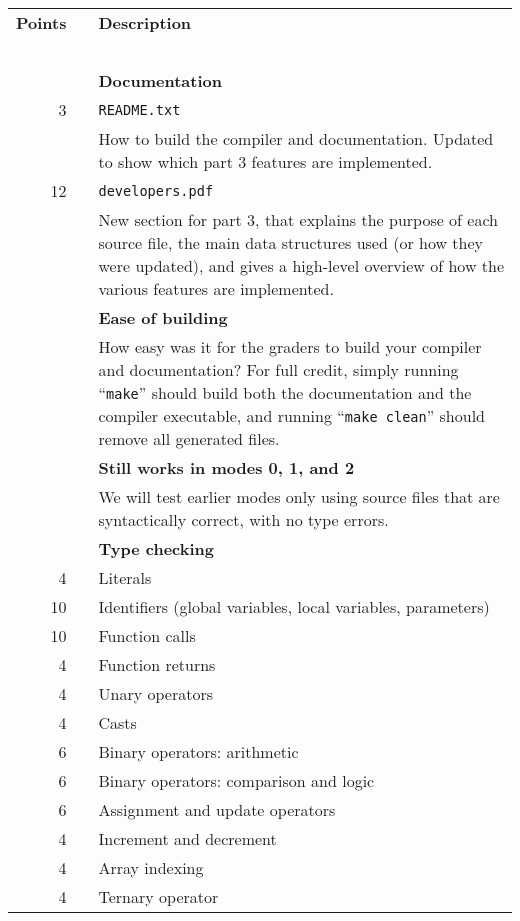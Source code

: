 \documentclass{article}
\makeatletter
\newcommand{\gradeline}{ \cline{1-2} \cline{4-4} ~\\[-1.5ex] }
\newenvironment{gradetable}{\begin{longtable}{@{}rrcp{5in}} \multicolumn{2}{l}{\bf Points} & & {\bf Description}\\ \gradeline}{\end{longtable}}
\newcommand{\mainitem}[2]{\pagebreak[2] {\bf #1} &&& {\bf #2}}
\newcommand{\mainpara}[1]{~ &&& {#1} }
\newcommand{\inneritem}[2]{~ & #1 && #2}
\newcommand{\innerpara}[1]{~ & ~ && #1}
\newcommand{\parser}{2}
\newcommand{\typecheck}{3}
\makeatother
\begin{document}
\noindent
\begin{gradetable}
  \mainitem{15}{Documentation}
  \\[1mm]
  \inneritem{3}{\tt README.txt}
  \\[1mm]
  \innerpara{%
    How to build the compiler and documentation.
    Updated to show which part \typecheck{} features are implemented.
  }
  \\[1mm]
  \inneritem{12}{\tt developers.pdf}
  \\[1mm]
  \innerpara{%
    New section for part \typecheck, that explains
    the purpose of each source file,
    the main data structures used (or how they were updated),
    and gives a high-level overview of how the various
    features are implemented.
  }
  \\[4mm]

  \mainitem{6}{Ease of building}
  \\[1mm]
  \innerpara{%
    How easy was it for the graders to build your compiler and
    documentation?
    For full credit, simply running ``{\tt make}''
    should build both the documentation and the compiler executable,
    and running ``{\tt make clean}'' should remove
    all generated files.
  }
  \\[4mm]

  \mainitem{8}{Still works in modes 0, 1, and \parser}
  \\[1mm]
  \mainpara{%
    We will test earlier modes only using source files
    that are syntactically correct,
    with no type errors.
  }
  \\[4mm]

  \mainitem{66}{Type checking}
  \\[1mm]
  \inneritem{4}{Literals}
  \\[1mm]
  \inneritem{10}{Identifiers (global variables, local variables, parameters)}
  \\[1mm]
  \inneritem{10}{Function calls}
  \\[1mm]
  \inneritem{4}{Function returns}
  \\[1mm]
  \inneritem{4}{Unary operators}
  \\[1mm]
  \inneritem{4}{Casts}
  \\[1mm]
  \inneritem{6}{Binary operators: arithmetic}
  \\[1mm]
  \inneritem{6}{Binary operators: comparison and logic}
  \\[1mm]
  \inneritem{6}{Assignment and update operators}
  \\[1mm]
  \inneritem{4}{Increment and decrement}
  \\[1mm]
  \inneritem{4}{Array indexing}
  \\[1mm]
  \inneritem{4}{Ternary operator}
  \\[4mm]


\end{gradetable}
\end{document}
